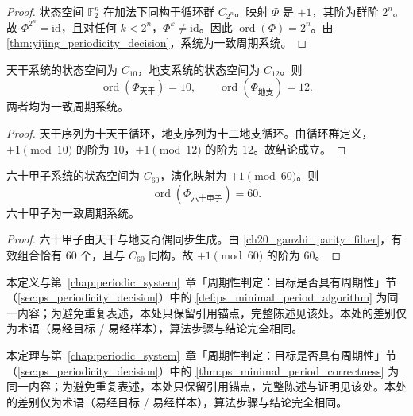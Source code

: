 \begin{proof}
状态空间 $\mathbb F_2^n$ 在加法下同构于循环群 $C_{2^n}$。映射 $\Phi$ 是 $+1$，其阶为群阶 $2^n$。故 $\Phi^{2^n}=\mathrm{id}$，且对任何 $k<2^n$，$\Phi^k\neq\mathrm{id}$。因此 $\operatorname{ord}(\Phi)=2^n$。由 \cref{thm:yijing_periodicity_decision}，系统为一致周期系统。
\end{proof}

\begin{lemma}[天干地支的周期判定]\label{lem:yijing_ganzhi_finite_order}
天干系统的状态空间为 $C_{10}$，地支系统的状态空间为 $C_{12}$。则
\[
\operatorname{ord}(\Phi_{\text{天干}})=10,\qquad
\operatorname{ord}(\Phi_{\text{地支}})=12.
\]
两者均为一致周期系统。
\end{lemma}

\begin{proof}
天干序列为十天干循环，地支序列为十二地支循环。由循环群定义，$+1\pmod{10}$ 的阶为 $10$，$+1\pmod{12}$ 的阶为 $12$。故结论成立。
\end{proof}

\begin{lemma}[六十甲子的周期判定]\label{lem:yijing_ganzhi60_finite_order}
六十甲子系统的状态空间为 $C_{60}$，演化映射为 $+1\pmod{60}$。则
\[
\operatorname{ord}(\Phi_{\text{六十甲子}})=60.
\]
六十甲子为一致周期系统。
\end{lemma}

\begin{proof}
六十甲子由天干与地支奇偶同步生成。由 \cref{ch20_ganzhi_parity_filter}，有效组合恰有 $60$ 个，且与 $C_{60}$ 同构。故 $+1\pmod{60}$ 的阶为 $60$。
\end{proof}

\begin{definition}[易经最小正周期算法]\label{def:yijing_minimal_period_algorithm}
本定义与第~\ref{chap:periodic_system}~章「周期性判定：目标是否具有周期性」节（\cref{sec:ps_periodicity_decision}）中的 \cref{def:ps_minimal_period_algorithm} 为同一内容；为避免重复表述，本处只保留引用锚点，完整陈述见该处。本处的差别仅为术语（易经目标 / 易经样本），算法步骤与结论完全相同。
\end{definition}

\begin{theorem}[易经最小正周期算法的正确性]\label{thm:yijing_minimal_period_correctness}
本定理与第~\ref{chap:periodic_system}~章「周期性判定：目标是否具有周期性」节（\cref{sec:ps_periodicity_decision}）中的 \cref{thm:ps_minimal_period_correctness} 为同一内容；为避免重复表述，本处只保留引用锚点，完整陈述与证明见该处。本处的差别仅为术语（易经目标 / 易经样本），算法步骤与结论完全相同。
\end{theorem}

